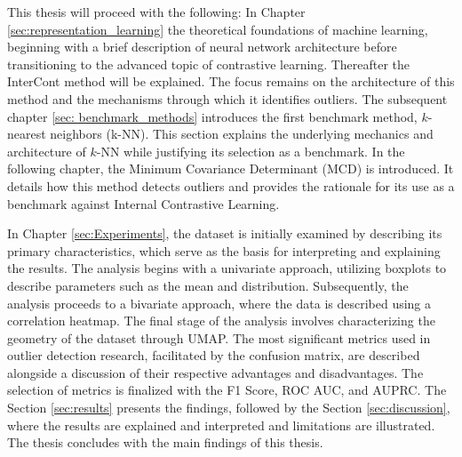 This thesis will proceed with the following: 
In Chapter \ref{sec:representation_learning} the theoretical foundations of machine learning, beginning with a brief description of neural network architecture before transitioning to the advanced topic of contrastive learning. 
Thereafter the InterCont method will be explained. 
The focus remains on the architecture of this method and the mechanisms through which it identifies outliers. 
The subsequent chapter \ref{sec: benchmark_methods} introduces the first benchmark method, $k$-nearest neighbors (k-NN). 
This section explains the underlying mechanics and architecture of $k$-NN while justifying its selection as a benchmark. 
In the following chapter, the Minimum Covariance Determinant (MCD) is introduced. 
It details how this method detects outliers and provides the rationale for its use as a benchmark against Internal Contrastive Learning.


In Chapter \ref{sec:Experiments}, the dataset is initially examined by describing its primary characteristics, which serve as the basis for interpreting and explaining the results. 
The analysis begins with a univariate approach, utilizing boxplots to describe parameters such as the mean and distribution. 
Subsequently, the analysis proceeds to a bivariate approach, where the data is described using a correlation heatmap. 
The final stage of the analysis involves characterizing the geometry of the dataset through UMAP. 
The most significant metrics used in outlier detection research, facilitated by the confusion matrix, are described alongside a discussion of their respective advantages and disadvantages. 
The selection of metrics is finalized with the F1 Score, ROC AUC, and AUPRC. 
The Section \ref{sec:results} presents the findings, followed by the Section \ref{sec:discussion}, where the results are explained and interpreted and limitations are illustrated. 
The thesis concludes with the main findings of this thesis.


